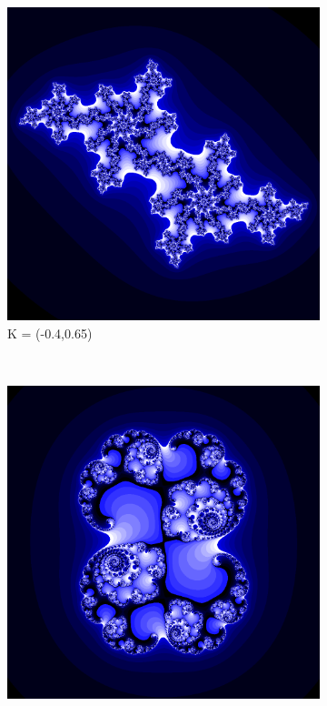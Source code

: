 \documentclass[a4paper]{article}
\begin{document}
\begin{figure}[h]
    \centering
    \begin{subfigure}[h]{0.25\textwidth}
        \includegraphics[width=\textwidth]{Julia(1)}
        \caption{K = (-0.4,0.65)}
        \label{fig:gull}
    \end{subfigure}%
    ~ %
    \begin{subfigure}[h]{0.25\textwidth}
        \includegraphics[width=\textwidth]{Julia(2)}

\end{subfigure}
\end{figure}
\end{document}
